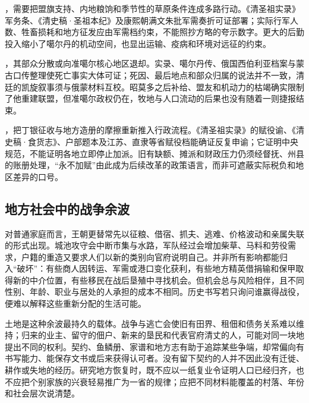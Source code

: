 \begin{event}
，需要把盟旗支持、内地粮饷和季节性的草原条件连成多路行动。《清圣祖实录》军务条、《清史稿·圣祖本纪》及康熙朝满文朱批军需奏折可证部署；实际行军人数、牲畜损耗和地方征发应由军需档约束，不能照抄方略的夸示数字。更大的后勤投入缩小了噶尔丹的机动空间，也显出运输、疫病和环境对远征的约束。
\end{event}

\begin{event}
，其部众分散或向准噶尔核心地区退却。实录、噶尔丹传、俄国西伯利亚档案与蒙古口传整理使死亡事实大体可证；死因、最后地点和部众归属的说法并不一致，清廷的凯旋叙事须与俄蒙材料互校。昭莫多之后补给、盟友和机动力的枯竭确实限制了他重建联盟，但准噶尔政权仍在，牧地与人口流动的后果也没有随着一则捷报结束。
\end{event}

\begin{event}
，把丁银征收与地方造册的摩擦重新推入行政流程。《清圣祖实录》的赋役谕、《清史稿·食货志》、户部题本及江苏、直隶等省赋役档能确证反复申谕；它证明中央规范，不能证明各地立即停止加派。旧有缺额、摊派和财政压力仍须经督抚、州县的账册处理，“永不加赋”由此成为后续改革的政策语言，而非可遮蔽实际税负和地区差异的口号。
\end{event}

\subsection*{地方社会中的战争余波}
对普通家庭而言，王朝更替常先以征粮、借宿、抓夫、逃难、价格波动和亲属失联的形式出现。城池攻守会中断市集与水路，军队经过会增加柴草、马料和劳役需求，户籍的重造又要求人们以新的类别向官府说明自己。并非所有影响都能归入“破坏”：有些商人因转运、军需或港口变化获利，有些地方精英借捐输和保甲取得新的中介位置，有些移民在战后垦殖中寻找机会。但机会总与风险相伴，且不同性别、年龄、职业与居处的人承担的成本不相同。历史书写若只询问谁赢得战役，便难以解释这些重新分配的生活可能。

土地是这种余波最持久的载体。战争与逃亡会使旧有田界、租佃和债务关系难以维持；归来的业主、留守的佃户、新来的垦民和代表官府清丈的人，可能对同一块地提出不同的权利。契约、鱼鳞册、家谱和地方志有助于追踪某些争端，却常偏向有书写能力、能保存文书或后来获得认可者。没有留下契约的人并不因此没有迁徙、耕作或失地的经历。研究地方恢复时，既不应以一纸复业令证明人口已经归齐，也不应把个别家族的兴衰轻易推广为一省的规律；应把不同材料能覆盖的村落、年份和社会层次说清楚。

